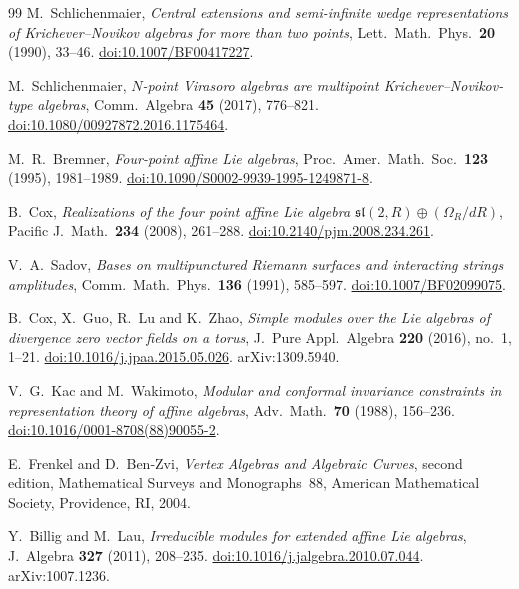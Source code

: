\documentclass[12pt]{amsart}
\theoremstyle{plain}
\theoremstyle{definition}
\begin{document}
\begin{thebibliography}{99}
M.~Schlichenmaier,
\textit{Central extensions and semi-infinite wedge representations of
  Krichever--Novikov algebras for more than two points},
Lett.\ Math.\ Phys.\ \textbf{20} (1990), 33--46.
\href{https://doi.org/10.1007/BF00417227}{doi:10.1007/BF00417227}.

M.~Schlichenmaier,
\textit{$N$-point Virasoro algebras are multipoint Krichever--Novikov-type
  algebras},
Comm.\ Algebra \textbf{45} (2017), 776--821.
\href{https://doi.org/10.1080/00927872.2016.1175464}{doi:10.1080/00927872.2016.1175464}.

M.~R.~Bremner,
\textit{Four-point affine Lie algebras},
Proc.\ Amer.\ Math.\ Soc.\ \textbf{123} (1995), 1981--1989.
\href{https://doi.org/10.1090/S0002-9939-1995-1249871-8}{doi:10.1090/S0002-9939-1995-1249871-8}.

B.~Cox,
\textit{Realizations of the four point affine Lie algebra
  $\mathfrak{sl}(2,R)\oplus(\Omega_R/dR)$},
Pacific J.\ Math.\ \textbf{234} (2008), 261--288.
\href{https://doi.org/10.2140/pjm.2008.234.261}{doi:10.2140/pjm.2008.234.261}.

V.~A.~Sadov,
\textit{Bases on multipunctured Riemann surfaces and interacting strings
  amplitudes},
Comm.\ Math.\ Phys.\ \textbf{136} (1991), 585--597.
\href{https://doi.org/10.1007/BF02099075}{doi:10.1007/BF02099075}.

B.~Cox, X.~Guo, R.~Lu and K.~Zhao,
\textit{Simple modules over the Lie algebras of divergence zero vector
  fields on a torus},
J.~Pure Appl.\ Algebra \textbf{220} (2016), no.~1, 1--21.
\href{https://doi.org/10.1016/j.jpaa.2015.05.026}{doi:10.1016/j.jpaa.2015.05.026}.
arXiv:1309.5940.

V.~G.~Kac and M.~Wakimoto,
\textit{Modular and conformal invariance constraints in representation
  theory of affine algebras},
Adv.\ Math.\ \textbf{70} (1988), 156--236.
\href{https://doi.org/10.1016/0001-8708(88)90055-2}{doi:10.1016/0001-8708(88)90055-2}.

E.~Frenkel and D.~Ben-Zvi,
\textit{Vertex Algebras and Algebraic Curves},
second edition, Mathematical Surveys and Monographs~88,
American Mathematical Society, Providence, RI, 2004.

Y.~Billig and M.~Lau,
\textit{Irreducible modules for extended affine Lie algebras},
J.~Algebra \textbf{327} (2011), 208--235.
\href{https://doi.org/10.1016/j.jalgebra.2010.07.044}{doi:10.1016/j.jalgebra.2010.07.044}.
arXiv:1007.1236.


\end{thebibliography}
\end{document}
